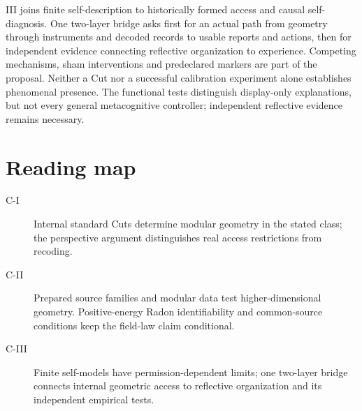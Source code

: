 \documentclass[11pt,a4paper]{article}
\begin{document}
III joins finite self-description to historically formed access and causal self-diagnosis. One two-layer bridge asks first for an actual path from geometry through instruments and decoded records to usable reports and actions, then for independent evidence connecting reflective organization to experience. Competing mechanisms, sham interventions and predeclared markers are part of the proposal. Neither a Cut nor a successful calibration experiment alone establishes phenomenal presence. The functional tests distinguish display-only explanations, but not every general metacognitive controller; independent reflective evidence remains necessary.

\section*{Reading map}
\begin{description}
\item[C-I] Internal standard Cuts determine modular geometry in the stated class; the perspective argument distinguishes real access restrictions from recoding.
\item[C-II] Prepared source families and modular data test higher-dimensional geometry. Positive-energy Radon identifiability and common-source conditions keep the field-law claim conditional.
\item[C-III] Finite self-models have permission-dependent limits; one two-layer bridge connects internal geometric access to reflective organization and its independent empirical tests.
\end{description}
\end{document}

